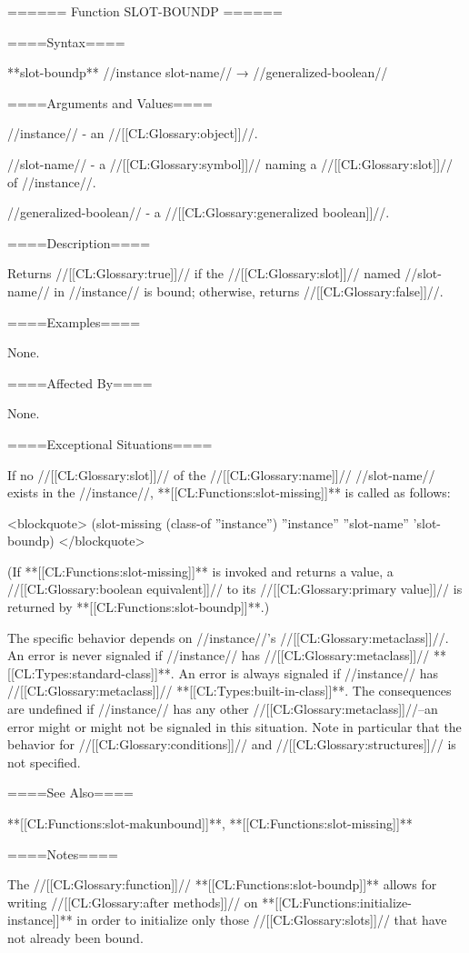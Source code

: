 ====== Function SLOT-BOUNDP ======


====Syntax====

**slot-boundp** //instance slot-name// → //generalized-boolean//

====Arguments and Values====

//instance// - an //[[CL:Glossary:object]]//.

//slot-name// - a //[[CL:Glossary:symbol]]// naming a //[[CL:Glossary:slot]]// of //instance//.

//generalized-boolean// - a //[[CL:Glossary:generalized boolean]]//.

====Description====

Returns //[[CL:Glossary:true]]// if the //[[CL:Glossary:slot]]// named //slot-name// in //instance// is bound; otherwise, returns //[[CL:Glossary:false]]//.

====Examples====

None.

====Affected By====

None.

====Exceptional Situations====

If no //[[CL:Glossary:slot]]// of the //[[CL:Glossary:name]]// //slot-name// exists in the //instance//, **[[CL:Functions:slot-missing]]** is called as follows:

<blockquote> (slot-missing (class-of ''instance'') ''instance'' ''slot-name'' 'slot-boundp) </blockquote>

(If **[[CL:Functions:slot-missing]]** is invoked and returns a value, a //[[CL:Glossary:boolean equivalent]]// to its //[[CL:Glossary:primary value]]// is returned by **[[CL:Functions:slot-boundp]]**.)

The specific behavior depends on //instance//'s //[[CL:Glossary:metaclass]]//. An error is never signaled if //instance// has //[[CL:Glossary:metaclass]]// **[[CL:Types:standard-class]]**. An error is always signaled if //instance// has //[[CL:Glossary:metaclass]]// **[[CL:Types:built-in-class]]**. The consequences are undefined if //instance// has any other //[[CL:Glossary:metaclass]]//--an error might or might not be signaled in this situation. Note in particular that the behavior for //[[CL:Glossary:conditions]]// and //[[CL:Glossary:structures]]// is not specified.


====See Also====

**[[CL:Functions:slot-makunbound]]**, **[[CL:Functions:slot-missing]]**

====Notes====

The //[[CL:Glossary:function]]// **[[CL:Functions:slot-boundp]]** allows for writing //[[CL:Glossary:after methods]]// on **[[CL:Functions:initialize-instance]]** in order to initialize only those //[[CL:Glossary:slots]]// that have not already been bound.


 
